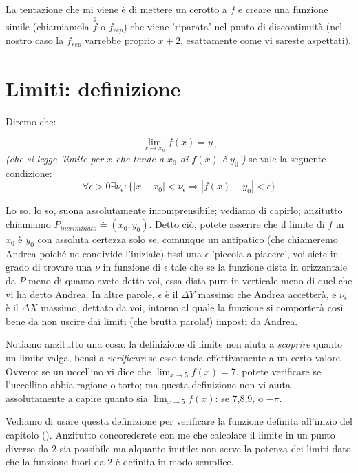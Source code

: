La tentazione che mi viene è di mettere un cerotto a $f$ e creare una funzione simile (chiamiamola $\stackrel{g}{f}$ o $f_{rep}$)
che viene 'riparata' nel punto di discontinuità (nel nostro caso la $f_{rep}$ varrebbe proprio $x+2$, esattamente come vi sareste
aspettati).


\section{Limiti: definizione}

Diremo che:

\begin{equation}
\lim_{x \to x_0} f(x) = y_{0}
\end{equation}
{\em (che si legge 'limite per $x$ che tende a $x_0$ di $f(x)$ è $y_0$')} se vale la seguente condizione:
\begin{equation}\label{definizionelimite}
\forall \epsilon >0 \exists \nu_\epsilon : \{ |x-x_0|<\nu_\epsilon \Longrightarrow  |f(x)-y_0|<\epsilon   \}
\end{equation}

Lo so, lo so, suona assolutamente incomprensibile; vediamo di capirlo; anzitutto chiamiamo $P_{incriminato} \doteq (x_0;y_0)$.
Detto ciò, potete asserire che il limite di $f$ in $x_0$ è $y_0$ con assoluta certezza solo se, comunque un antipatico (che
chiameremo Andrea poiché ne condivide l'iniziale) fissi una $\epsilon$ 'piccola a piacere', voi siete in grado di trovare una
$\nu$ in funzione di $\epsilon$ tale che se la funzione dista in orizzantale da $P$ meno di quanto avete detto voi, essa dista
pure in verticale meno di quel che vi ha detto Andrea. In altre parole, $\epsilon$ è il $\Delta Y$ massimo che Andrea accetterà,
e $\nu_\epsilon$ è il $\Delta X$ massimo, dettato da voi, intorno al quale la funzione si comporterà così bene da non uscire dai
limiti (che brutta parola!) imposti da Andrea.

Notiamo anzitutto una cosa: la definizione di limite non aiuta a {\em scoprire} quanto un limite valga, bensì a {\em verificare}
se esso tenda effettivamente a un certo valore. Ovvero: se un uccellino vi dice che $\lim_{x \to 5} f(x)=7$, potete verificare
se l'uccellino abbia ragione o torto; ma questa definizione non vi aiuta assolutamente a capire quanto sia $\lim_{x \to 5} f(x)$:
se $7$,$8$,$9$, o $-\pi$.

Vediamo di usare questa definizione per verificare la funzione definita all'inizio del capitolo ().
Anzitutto concorederete con me che calcolare il limite in un punto diverso da $2$ sia possibile ma alquanto inutile: non serve
la potenza dei limiti dato che la funzione fuori da $2$ è definita in modo semplice.

